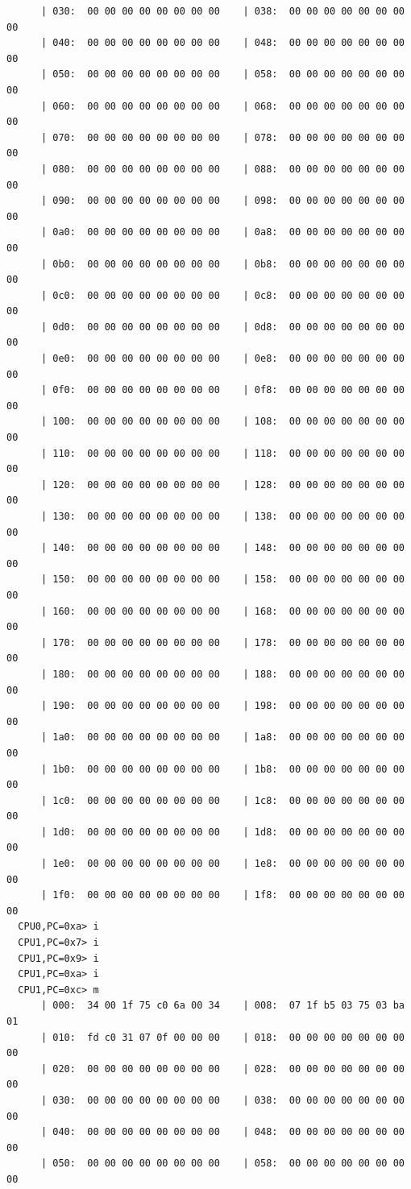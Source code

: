 \documentclass[dvipdfmx]{jsarticle}
\begin{document}
\begin{verbatim}
      | 030:  00 00 00 00 00 00 00 00    | 038:  00 00 00 00 00 00 00 00
      | 040:  00 00 00 00 00 00 00 00    | 048:  00 00 00 00 00 00 00 00
      | 050:  00 00 00 00 00 00 00 00    | 058:  00 00 00 00 00 00 00 00
      | 060:  00 00 00 00 00 00 00 00    | 068:  00 00 00 00 00 00 00 00
      | 070:  00 00 00 00 00 00 00 00    | 078:  00 00 00 00 00 00 00 00
      | 080:  00 00 00 00 00 00 00 00    | 088:  00 00 00 00 00 00 00 00
      | 090:  00 00 00 00 00 00 00 00    | 098:  00 00 00 00 00 00 00 00
      | 0a0:  00 00 00 00 00 00 00 00    | 0a8:  00 00 00 00 00 00 00 00
      | 0b0:  00 00 00 00 00 00 00 00    | 0b8:  00 00 00 00 00 00 00 00
      | 0c0:  00 00 00 00 00 00 00 00    | 0c8:  00 00 00 00 00 00 00 00
      | 0d0:  00 00 00 00 00 00 00 00    | 0d8:  00 00 00 00 00 00 00 00
      | 0e0:  00 00 00 00 00 00 00 00    | 0e8:  00 00 00 00 00 00 00 00
      | 0f0:  00 00 00 00 00 00 00 00    | 0f8:  00 00 00 00 00 00 00 00
      | 100:  00 00 00 00 00 00 00 00    | 108:  00 00 00 00 00 00 00 00
      | 110:  00 00 00 00 00 00 00 00    | 118:  00 00 00 00 00 00 00 00
      | 120:  00 00 00 00 00 00 00 00    | 128:  00 00 00 00 00 00 00 00
      | 130:  00 00 00 00 00 00 00 00    | 138:  00 00 00 00 00 00 00 00
      | 140:  00 00 00 00 00 00 00 00    | 148:  00 00 00 00 00 00 00 00
      | 150:  00 00 00 00 00 00 00 00    | 158:  00 00 00 00 00 00 00 00
      | 160:  00 00 00 00 00 00 00 00    | 168:  00 00 00 00 00 00 00 00
      | 170:  00 00 00 00 00 00 00 00    | 178:  00 00 00 00 00 00 00 00
      | 180:  00 00 00 00 00 00 00 00    | 188:  00 00 00 00 00 00 00 00
      | 190:  00 00 00 00 00 00 00 00    | 198:  00 00 00 00 00 00 00 00
      | 1a0:  00 00 00 00 00 00 00 00    | 1a8:  00 00 00 00 00 00 00 00
      | 1b0:  00 00 00 00 00 00 00 00    | 1b8:  00 00 00 00 00 00 00 00
      | 1c0:  00 00 00 00 00 00 00 00    | 1c8:  00 00 00 00 00 00 00 00
      | 1d0:  00 00 00 00 00 00 00 00    | 1d8:  00 00 00 00 00 00 00 00
      | 1e0:  00 00 00 00 00 00 00 00    | 1e8:  00 00 00 00 00 00 00 00
      | 1f0:  00 00 00 00 00 00 00 00    | 1f8:  00 00 00 00 00 00 00 00
  CPU0,PC=0xa> i
  CPU1,PC=0x7> i
  CPU1,PC=0x9> i
  CPU1,PC=0xa> i
  CPU1,PC=0xc> m
      | 000:  34 00 1f 75 c0 6a 00 34    | 008:  07 1f b5 03 75 03 ba 01
      | 010:  fd c0 31 07 0f 00 00 00    | 018:  00 00 00 00 00 00 00 00
      | 020:  00 00 00 00 00 00 00 00    | 028:  00 00 00 00 00 00 00 00
      | 030:  00 00 00 00 00 00 00 00    | 038:  00 00 00 00 00 00 00 00
      | 040:  00 00 00 00 00 00 00 00    | 048:  00 00 00 00 00 00 00 00
      | 050:  00 00 00 00 00 00 00 00    | 058:  00 00 00 00 00 00 00 00

\end{verbatim}
\end{document}
